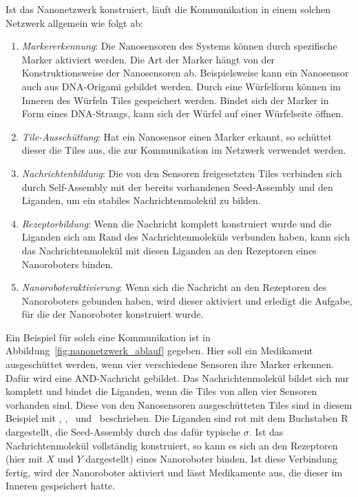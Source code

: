 Ist das Nanonetzwerk konstruiert, läuft die Kommunikation in einem solchen Netzwerk allgemein wie folgt ab:
\begin{enumerate}
	\item \emph{Markererkennung}: Die Nanosensoren des Systems können durch spezifische Marker aktiviert werden. 
	Die Art der Marker hängt von der Konstruktionsweise der Nanosensoren ab.
	Beispielsweise kann ein Nanosensor auch aus DNA-Origami gebildet werden. Durch eine Würfelform können im Inneren des Würfeln Tiles gespeichert werden. Bindet sich der Marker in Form eines DNA-Strangs, kann sich der Würfel auf einer Würfelseite öffnen.\cite{douglas2012logic}
	\item \emph{Tile-Ausschüttung}: Hat ein Nanosensor einen Marker erkannt, so schüttet dieser die Tiles aus, die zur Kommunikation im Netzwerk verwendet werden. 
	\item \emph{Nachrichtenbildung}: Die von den Sensoren freigesetzten Tiles verbinden sich durch Self-Assembly mit der bereits vorhandenen Seed-Assembly und den Liganden, um ein stabiles Nachrichtenmolekül zu bilden.
	\item \emph{Rezeptorbildung}:  Wenn die Nachricht komplett konstruiert wurde und die Liganden sich am Rand des Nachrichtenmoleküls verbunden haben, kann sich das Nachrichtenmolekül mit diesen Liganden an den Rezeptoren eines Nanoroboters binden.
	\item \emph{Nanoroboteraktivierung}: Wenn sich die Nachricht an den Rezeptoren des Nanoroboters gebunden haben, wird dieser aktiviert und erledigt die Aufgabe, für die der Nanoroboter konstruiert wurde.
\end{enumerate}

Ein Beispiel für solch eine Kommunikation ist in Abbildung~\ref{fig:nanonetzwerk_ablauf} gegeben. Hier soll ein Medikament ausgeschüttet werden, wenn vier verschiedene Sensoren ihre Marker erkennen. Dafür wird eine \glqq AND\grqq-Nachricht gebildet. 
Das Nachrichtenmolekül bildet sich nur komplett und bindet die Liganden, wenn die Tiles von allen vier Sensoren vorhanden sind. 
Diese von den Nanosensoren ausgeschütteten Tiles sind in diesem Beispiel mit \grqq, \grqq, \grqq\, und \grqq\, beschrieben.
Die Liganden sind rot mit dem Buchstaben \glqq R\grqq\, dargestellt, die Seed-Assembly durch das dafür typische $\sigma$.
Ist das Nachrichtenmolekül vollständig konstruiert, so kann es sich an den Rezeptoren (hier mit $X$ und $Y$ dargestellt) eines Nanoroboter binden.
Ist diese Verbindung fertig, wird der Nanoroboter aktiviert und lässt Medikamente aus, die dieser im Inneren gespeichert hatte.\cite{lau2020phd}

